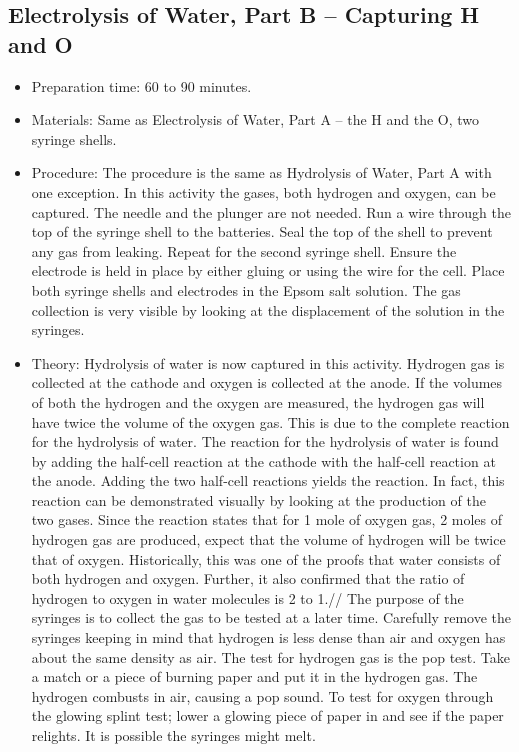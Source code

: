 \subsection{Electrolysis of Water, Part B – Capturing H and O}
\begin{itemize}
\item{Preparation time: 60 to 90 minutes. }
\item{Materials: Same as Electrolysis of Water, Part A – the H and the O, two syringe shells.}
\item{Procedure: The procedure is the same as Hydrolysis of Water, Part A with one exception. In this activity the gases, both hydrogen and oxygen, can be captured. The needle and the plunger are not needed. Run a wire through the top of the syringe shell to the batteries. Seal the top of the shell to prevent any gas from leaking. Repeat for the second syringe shell. Ensure the electrode is held in place by either gluing or using the wire for the cell. Place both syringe shells and electrodes in the Epsom salt solution. The gas collection is very visible by looking at the displacement of the solution in the syringes. }
\item{Theory: Hydrolysis of water is now captured in this activity. Hydrogen gas is collected at the cathode and oxygen is collected at the anode. If the volumes of both the hydrogen and the oxygen are measured, the hydrogen gas will have twice the volume of the oxygen gas. This is due to the complete reaction for the hydrolysis of water. The reaction for the hydrolysis of water is found by adding the half-cell reaction at the cathode with the half-cell reaction at the anode. Adding the two half-cell reactions yields the reaction. In fact, this reaction can be demonstrated visually by looking at the production of the two gases. Since the reaction states that for 1 mole of oxygen gas, 2 moles of hydrogen gas are produced, expect that the volume of hydrogen will be twice that of oxygen. Historically, this was one of the proofs that water consists of both hydrogen and oxygen. Further, it also confirmed that the ratio of hydrogen to oxygen in water molecules is 2 to 1.//
The purpose of the syringes is to collect the gas to be tested at a later time. Carefully remove the syringes keeping in mind that hydrogen is less dense than air and oxygen has about the same density as air. The test for hydrogen gas is the pop test. Take a match or a piece of burning paper and put it in the hydrogen gas. The hydrogen combusts in air, causing a pop sound. To test for oxygen through the glowing splint test; lower a glowing piece of paper in and see if the paper relights. It is possible the syringes might melt. }
\end{itemize}

